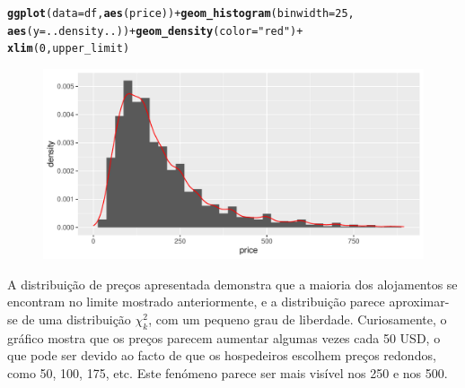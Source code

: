 \documentclass[justified, 11pt]{scrartcl}\usepackage[]{graphicx}\usepackage[]{xcolor}
\makeatletter
\def\maxwidth{ %
  \ifdim\Gin@nat@width>\linewidth
    \linewidth
  \else
    \Gin@nat@width
  \fi
}
\newcommand{\hlnum}[1]{\textcolor[rgb]{0.686,0.059,0.569}{#1}}%
\newcommand{\hlstr}[1]{\textcolor[rgb]{0.192,0.494,0.8}{#1}}%
\newcommand{\hlopt}[1]{\textcolor[rgb]{0,0,0}{#1}}%
\newcommand{\hlstd}[1]{\textcolor[rgb]{0.345,0.345,0.345}{#1}}%
\newcommand{\hlkwc}[1]{\textcolor[rgb]{0.333,0.667,0.333}{#1}}%
\newcommand{\hlkwd}[1]{\textcolor[rgb]{0.737,0.353,0.396}{\textbf{#1}}}%
\newenvironment{kframe}{%
 \def\at@end@of@kframe{}%
 \ifinner\ifhmode%
  \def\at@end@of@kframe{\end{minipage}}%
  \begin{minipage}{\columnwidth}%
 \fi\fi%
 \def\FrameCommand##1{\hskip\@totalleftmargin \hskip-\fboxsep
 \colorbox{shadecolor}{##1}\hskip-\fboxsep
     \hskip-\linewidth \hskip-\@totalleftmargin \hskip\columnwidth}%
 \MakeFramed {\advance\hsize-\width
   \@totalleftmargin\z@ \linewidth\hsize
   \@setminipage}}%
 {\par\unskip\endMakeFramed%
 \at@end@of@kframe}
\newenvironment{knitrout}{}{} %
\makeatother
\begin{document}
\begin{knitrout}
\color{fgcolor}\begin{kframe}
\begin{alltt}
\hlkwd{ggplot}\hlstd{(}\hlkwc{data} \hlstd{= df,} \hlkwd{aes}\hlstd{(price))} \hlopt{+} \hlkwd{geom_histogram}\hlstd{(}\hlkwc{binwidth} \hlstd{=} \hlnum{25}\hlstd{,}
    \hlkwd{aes}\hlstd{(}\hlkwc{y} \hlstd{= ..density..))} \hlopt{+} \hlkwd{geom_density}\hlstd{(}\hlkwc{color} \hlstd{=} \hlstr{"red"}\hlstd{)} \hlopt{+}
    \hlkwd{xlim}\hlstd{(}\hlnum{0}\hlstd{, upper_limit)}
\end{alltt}
\end{kframe}\begin{figure}
\includegraphics[width=\maxwidth]{figure/chunk-priceHist-1} \end{figure}

\end{knitrout}
A distribuição de preços apresentada demonstra que a maioria dos alojamentos se encontram no limite mostrado anteriormente, e a distribuição parece aproximar-se de uma distribuição $\chi_{k}^{2}$, com um pequeno grau de liberdade. Curiosamente, o gráfico mostra que os preços parecem aumentar algumas vezes cada 50 USD, o que pode ser devido ao facto de que os hospedeiros escolhem preços redondos, como 50, 100, 175, etc. Este fenómeno parece ser mais visível nos 250 e nos 500.\\
\end{document}

